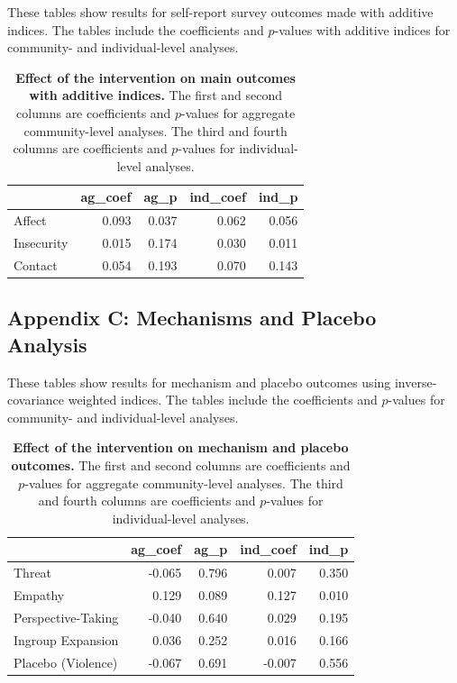 \documentclass[11pt]{article}
\begin{document}
These tables show results for self-report survey outcomes made with
additive indices. The tables include the coefficients and \(p\)-values
with additive indices for community- and individual-level analyses.

\begin{table}[H]
\begin{center}

\begin{tabular}{l|r|r|r|r}
\hline
  & ag\_coef & ag\_p & ind\_coef & ind\_p\\
\hline
Affect & 0.093 & 0.037 & 0.062 & 0.056\\
\hline
Insecurity & 0.015 & 0.174 & 0.030 & 0.011\\
\hline
Contact & 0.054 & 0.193 & 0.070 & 0.143\\
\hline
\end{tabular}


\caption{\label{tab:add_ind_tab}\textbf{Effect of the intervention on main outcomes with additive indices.} The first and second columns are coefficients and $p$-values for aggregate community-level analyses.  The third and fourth columns are coefficients and $p$-values for individual-level analyses.}
\end{center}
\end{table}

\hypertarget{appendix-c-mechanisms-and-placebo-analysis}{%
\subsection{Appendix C: Mechanisms and Placebo
Analysis}\label{appendix-c-mechanisms-and-placebo-analysis}}

These tables show results for mechanism and placebo outcomes using
inverse-covariance weighted indices. The tables include the coefficients
and \(p\)-values for community- and individual-level analyses.

\begin{table}[H]
\begin{center}

\begin{tabular}{l|r|r|r|r}
\hline
  & ag\_coef & ag\_p & ind\_coef & ind\_p\\
\hline
Threat & -0.065 & 0.796 & 0.007 & 0.350\\
\hline
Empathy & 0.129 & 0.089 & 0.127 & 0.010\\
\hline
Perspective-Taking & -0.040 & 0.640 & 0.029 & 0.195\\
\hline
Ingroup Expansion & 0.036 & 0.252 & 0.016 & 0.166\\
\hline
Placebo (Violence) & -0.067 & 0.691 & -0.007 & 0.556\\
\hline
\end{tabular}


\caption{\label{tab:mech_ind_tab}\textbf{Effect of the intervention on mechanism and placebo outcomes.} The first and second columns are coefficients and $p$-values for aggregate community-level analyses.  The third and fourth columns are coefficients and $p$-values for individual-level analyses.}
\end{center}
\end{table}
\end{document}
